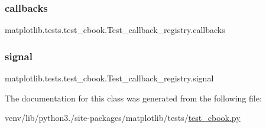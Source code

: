 \subsubsection{\texorpdfstring{callbacks}{callbacks}}
{\footnotesize\ttfamily matplotlib.\+tests.\+test\+\_\+cbook.\+Test\+\_\+callback\+\_\+registry.\+callbacks}

\mbox{\label{classmatplotlib_1_1tests_1_1test__cbook_1_1Test__callback__registry_a650cf469088045c9de757288b876b662}} 
\subsubsection{\texorpdfstring{signal}{signal}}
{\footnotesize\ttfamily matplotlib.\+tests.\+test\+\_\+cbook.\+Test\+\_\+callback\+\_\+registry.\+signal}



The documentation for this class was generated from the following file\+:\begin{DoxyCompactItemize}
\item 
venv/lib/python3./site-\/packages/matplotlib/tests/\hyperlink{test__cbook_8py}{test\+\_\+cbook.\+py}\end{DoxyCompactItemize}
